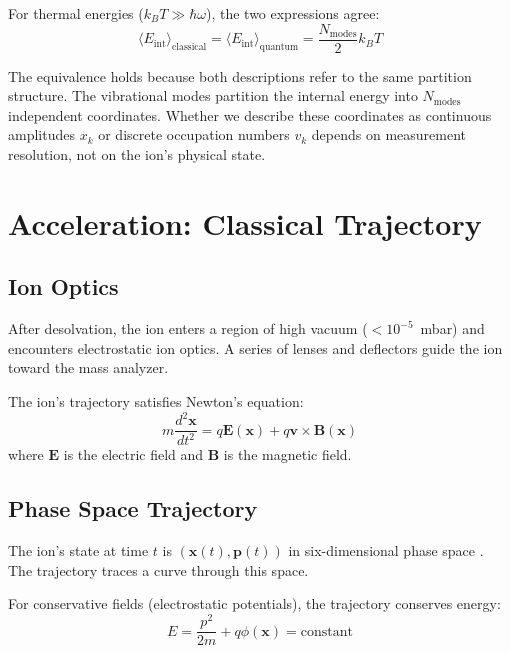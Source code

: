 \documentclass[twocolumn,10pt]{article}
\theoremstyle{remark}
\begin{document}
For thermal energies ($k_B T \gg \hbar \omega$), the two expressions agree:
\begin{equation}
\langle E_{\text{int}} \rangle_{\text{classical}} = \langle E_{\text{int}} \rangle_{\text{quantum}} = \frac{N_{\text{modes}}}{2} k_B T
\end{equation}

The equivalence holds because both descriptions refer to the same partition structure. The vibrational modes partition the internal energy into $N_{\text{modes}}$ independent coordinates. Whether we describe these coordinates as continuous amplitudes $x_k$ or discrete occupation numbers $v_k$ depends on measurement resolution, not on the ion's physical state.


\section{Acceleration: Classical Trajectory}
\label{sec:acceleration}

\subsection{Ion Optics}

After desolvation, the ion enters a region of high vacuum ($< 10^{-5}$~mbar) and encounters electrostatic ion optics. A series of lenses and deflectors guide the ion toward the mass analyzer.

The ion's trajectory satisfies Newton's equation:
\begin{equation}
m \frac{d^2 \mathbf{x}}{dt^2} = q \mathbf{E}(\mathbf{x}) + q \mathbf{v} \times \mathbf{B}(\mathbf{x})
\end{equation}
where $\mathbf{E}$ is the electric field and $\mathbf{B}$ is the magnetic field.

\subsection{Phase Space Trajectory}

The ion's state at time $t$ is $(\mathbf{x}(t), \mathbf{p}(t))$ in six-dimensional phase space \cite{goldstein2002classical,arnold1989mathematical}. The trajectory traces a curve through this space.

For conservative fields (electrostatic potentials), the trajectory conserves energy:
\begin{equation}
E = \frac{p^2}{2m} + q\phi(\mathbf{x}) = \text{constant}
\end{equation}
\end{document}
